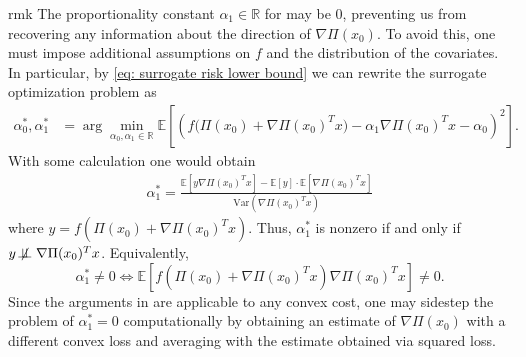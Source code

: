 \documentclass[11pt]{article}
\begin{document}
\begin{restatable}{rmk}{}
    The proportionality constant $\alpha_1 \in \mathbb{R}$ for  may be $0$, preventing us from recovering any information about the direction of $\nabla\Pi(x_0)$. To avoid this, one must impose additional assumptions on $f$ and the distribution of the covariates. In particular, by \cref{eq: surrogate risk lower bound} we can rewrite the surrogate optimization problem as
    \begin{align}
        \alpha_0^*, \alpha_1^* &= \arg\min_{\alpha_0, \alpha_1 \in \mathbb{R}} \mathbb{E}\left[\left(f\Big(\Pi(x_0) + \nabla\Pi(x_0)^{T}x\Big) - \alpha_1 \nabla\Pi(x_0)^Tx - \alpha_0 \right)^2\right].
    \end{align}
    With some calculation one would obtain
    \begin{align}
        \alpha_1^* = \frac{\mathbb{E}\left[y\nabla\Pi(x_0)^Tx\right] - \mathbb{E}[y]\cdot \mathbb{E}\left[\nabla\Pi(x_0)^Tx\right]}{\text{Var}(\nabla\Pi(x_0)^Tx)}
    \end{align}
    where $y = f\left(\Pi(x_0) + \nabla\Pi(x_0)^Tx\right)$. Thus, $
    \alpha_1^*$ is nonzero if and only if $y \not\!\perp\!\!\!\perp \nabla\Pi(x_0)^Tx$. Equivalently, 
    \[\alpha_1^* \neq 0 \iff \mathbb{E}\left[f\left(\Pi(x_0) + \nabla\Pi(x_0)^Tx\right)\nabla\Pi(x_0)^Tx\right] \neq 0.\]
    Since the arguments in  are applicable to any convex cost, one may sidestep the problem of $\alpha^*_1 = 0$ computationally by obtaining an estimate of $\nabla\Pi(x_0)$ with a different convex loss and averaging with the estimate obtained via squared loss.
    
    
\end{restatable}
\end{document}
